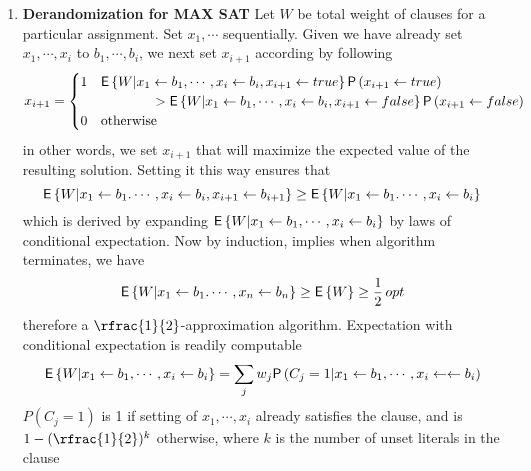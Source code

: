 \documentclass[11pt]{article}
\begin{document}
\begin{enumerate}
    \item \textbf{Derandomization for MAX SAT} Let $W$ be total weight of clauses for a particular assignment. Set $x_1, \cdots$ sequentially. Given we have already set $x_1,\cdots, x_i$ to $b_1, \cdots, b_i$, we next set $x_{i+1}$ according by following
    \[
        x_{i+1} = 
        \begin{cases}
            1 & \mathsf{E}\left\{W | x_1 \leftarrow b_1, \cdots, x_i \leftarrow b_i, x_{i+1}\leftarrow true\right\} \mathsf{P}\left(x_{i+1}\leftarrow true\right) 
            \\
            &\qquad \qquad > \mathsf{E}\left\{W | x_1 \leftarrow b_1, \cdots, x_i \leftarrow b_i, x_{i+1}\leftarrow false\right\} \mathsf{P}\left(x_{i+1}\leftarrow false\right) \\
            0 & \text{otherwise}
        \end{cases}    
    \]
    in other words, we set $x_{i+1}$ that will maximize the expected value of the resulting solution. Setting it this way ensures that
    \[
        \mathsf{E}\left\{W|x_1\leftarrow b_1. \cdots, x_{i}\leftarrow b_i, x_{i+1}\leftarrow b_{i+1}\right\} 
        \geq \mathsf{E}\left\{W|x_1\leftarrow b_1. \cdots, x_{i}\leftarrow b_i\right\}
    \]
    which is derived by expanding $\mathsf{E}\left\{W|x_1\leftarrow b_1, \cdots, x_i\leftarrow b_i\right\}$ by laws of conditional expectation. Now by induction, implies when algorithm terminates, we have 
    \[
        \mathsf{E}\left\{W|x_1\leftarrow b_1. \cdots, x_{n}\leftarrow b_n\right\}
        \geq \mathsf{E}\left\{W\right\} \geq \frac{1}{2} \, opt
    \]
    therefore a $\rfrac{1}{2}$-approximation algorithm. Expectation with conditional expectation is readily computable  
    \[
        \mathsf{E}\left\{W|x_1 \leftarrow b_1, \cdots, x_i \leftarrow  b_i\right\} = 
        \sum_j w_j \mathsf{P}\left(C_j=1|x_1 \leftarrow b_1, \cdots, x_i \leftarrow \leftarrow b_i\right)
    \]
    $P(C_j=1)$ is 1 if setting of $x_1,\cdots,x_i$ already satisfies the clause, and is $1-(\rfrac{1}{2})^k$ otherwise, where $k$ is the number of unset literals in the clause
\end{enumerate}

 
\end{document}
